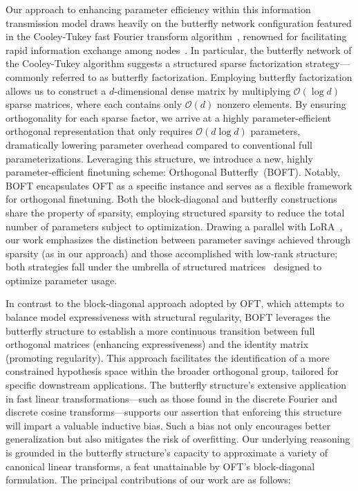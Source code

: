 Our approach to enhancing parameter efficiency within this information transmission model draws heavily on the butterfly network configuration featured in the Cooley-Tukey fast Fourier transform algorithm~\cite{cooley1965algorithm}, renowned for facilitating rapid information exchange among nodes~\cite{klasing1994broadcasting}. In particular, the butterfly network of the Cooley-Tukey algorithm suggests a structured sparse factorization strategy—commonly referred to as butterfly factorization. Employing butterfly factorization allows us to construct a $d$-dimensional dense matrix by multiplying $\mathcal{O}(\log d)$ sparse matrices, where each contains only $\mathcal{O}(d)$ nonzero elements. By ensuring orthogonality for each sparse factor, we arrive at a highly parameter-efficient orthogonal representation that only requires $\mathcal{O}(d \log d)$ parameters, dramatically lowering parameter overhead compared to conventional full parameterizations. Leveraging this structure, we introduce a new, highly parameter-efficient finetuning scheme: Orthogonal Butterfly~(BOFT). Notably, BOFT encapsulates OFT as a specific instance and serves as a flexible framework for orthogonal finetuning. Both the block-diagonal and butterfly constructions share the property of sparsity, employing structured sparsity to reduce the total number of parameters subject to optimization. Drawing a parallel with LoRA~\cite{hulora2022}, our work emphasizes the distinction between parameter savings achieved through sparsity (as in our approach) and those accomplished with low-rank structure; both strategies fall under the umbrella of structured matrices~\cite{candes2011robust} designed to optimize parameter usage.

In contrast to the block-diagonal approach adopted by OFT, which attempts to balance model expressiveness with structural regularity, BOFT leverages the butterfly structure to establish a more continuous transition between full orthogonal matrices (enhancing expressiveness) and the identity matrix (promoting regularity). This approach facilitates the identification of a more constrained hypothesis space within the broader orthogonal group, tailored for specific downstream applications. The butterfly structure's extensive application in fast linear transformations—such as those found in the discrete Fourier and discrete cosine transforms—supports our assertion that enforcing this structure will impart a valuable inductive bias. Such a bias not only encourages better generalization but also mitigates the risk of overfitting. Our underlying reasoning is grounded in the butterfly structure's capacity to approximate a variety of canonical linear transforms, a feat unattainable by OFT's block-diagonal formulation. The principal contributions of our work are as follows:


